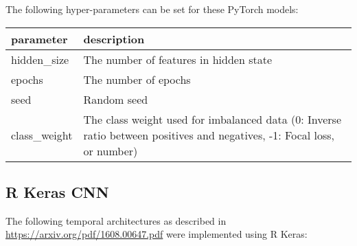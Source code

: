 \documentclass[
]{article}
\begin{document}
The following hyper-parameters can be set for these PyTorch models:

\begin{longtable}[]{@{}ll@{}}
\toprule
\begin{minipage}[b]{0.26\columnwidth}\raggedright
parameter\strut
\end{minipage} & \begin{minipage}[b]{0.68\columnwidth}\raggedright
description\strut
\end{minipage}\tabularnewline
\midrule
\endhead
\begin{minipage}[t]{0.26\columnwidth}\raggedright
hidden\_size\strut
\end{minipage} & \begin{minipage}[t]{0.68\columnwidth}\raggedright
The number of features in hidden state\strut
\end{minipage}\tabularnewline
\begin{minipage}[t]{0.26\columnwidth}\raggedright
epochs\strut
\end{minipage} & \begin{minipage}[t]{0.68\columnwidth}\raggedright
The number of epochs\strut
\end{minipage}\tabularnewline
\begin{minipage}[t]{0.26\columnwidth}\raggedright
seed\strut
\end{minipage} & \begin{minipage}[t]{0.68\columnwidth}\raggedright
Random seed\strut
\end{minipage}\tabularnewline
\begin{minipage}[t]{0.26\columnwidth}\raggedright
class\_weight\strut
\end{minipage} & \begin{minipage}[t]{0.68\columnwidth}\raggedright
The class weight used for imbalanced data (0: Inverse ratio between
positives and negatives, -1: Focal loss, or number)\strut
\end{minipage}\tabularnewline
\bottomrule
\end{longtable}

\newpage

\hypertarget{r-keras-cnn}{%
\subsection{R Keras CNN}\label{r-keras-cnn}}

The following temporal architectures as described in
\url{https://arxiv.org/pdf/1608.00647.pdf} were implemented using R
Keras:
\end{document}
